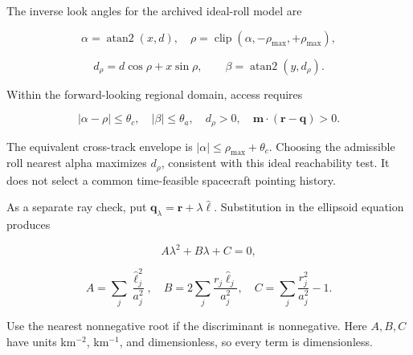\documentclass[10pt,a4paper]{article}
\numberwithin{equation}{section}
\begin{document}
\begin{sloppypar}The inverse look angles for the archived ideal-roll model are\end{sloppypar}


\begin{equation}\alpha=\operatorname{atan2}(x,d),\quad
\rho=\operatorname{clip}(\alpha,-\rho_{\max},+\rho_{\max}),\label{eq:inverse-look}\end{equation}

\begin{equation}d_\rho=d\cos\rho+x\sin\rho,\qquad
\beta=\operatorname{atan2}(y,d_\rho).\label{eq:ch7-6}\end{equation}

\begin{sloppypar}Within the forward-looking regional domain, access requires\end{sloppypar}


\begin{equation}|\alpha-\rho|\le\theta_c,\quad |\beta|\le\theta_a,\quad
d_\rho>0,\quad \mathbf m\cdot(\mathbf r-\mathbf q)>0.\label{eq:ch7-7}\end{equation}

\begin{sloppypar}The equivalent cross-track envelope is \(|\alpha|\le\rho_{\max}+\theta_c\). Choosing the admissible roll nearest alpha maximizes \(d_\rho\), consistent with this ideal reachability test. It does not select a common time-feasible spacecraft pointing history.\end{sloppypar}


\begin{sloppypar}As a separate ray check, put \(\mathbf q_\lambda=\mathbf r+\lambda\hat{\boldsymbol\ell}\). Substitution in the ellipsoid equation produces\end{sloppypar}


\begin{equation}A\lambda^2+B\lambda+C=0,\label{eq:ch7-8}\end{equation}

\begin{equation}A=\sum_j\frac{\hat\ell_j^2}{a_j^2},\quad
B=2\sum_j\frac{r_j\hat\ell_j}{a_j^2},\quad
C=\sum_j\frac{r_j^2}{a_j^2}-1.\label{eq:ch7-9}\end{equation}

\begin{sloppypar}Use the nearest nonnegative root if the discriminant is nonnegative. Here \(A,B,C\) have units km\(^{-2}\), km\(^{-1}\), and dimensionless, so every term is dimensionless.\end{sloppypar}
\end{document}
